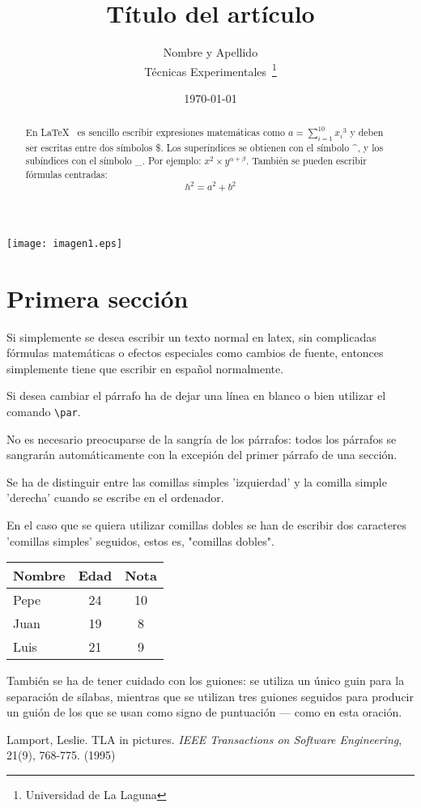 \documentclass[a4paper,12pt]{article}
\begin{document}
\texttt{[image: imagen1.eps]}
\title{Título del artículo}
  \author{Nombre y Apellido \\
          Técnicas Experimentales~\footnote{Universidad de La Laguna}
         }
  \date{\today}
  \maketitle
   \begin{abstract}
     En \LaTeX{}~\cite{Lam:86} es sencillo escribir expresiones
     matemáticas como $a=\sum_{i=1}^{10} {x_i}^{3}$
     y deben ser escritas entre dos símbolos \$.
     Los superíndices se obtienen con el símbolo \^{}, y
     los subíndices con el símbolo \_.
     Por ejemplo: $x^2 \times y^{\alpha + \beta}$.
     También se pueden escribir f\'ormulas centradas:
   \[h^2=a^2 + b^2 \]
 \end{abstract}
 \section{Primera sección}
Si simplemente se desea escribir un texto normal en latex,
sin complicadas f\'ormulas matem\'aticas o efectos especiales
como cambios  de fuente, entonces simplemente tiene que escribir
en espa\~nol normalmente.
\par
Si desea cambiar el p\'arrafo ha de dejar una l\'inea en blanco o bien
utilizar el comando \verb|\par|.

No es necesario preocuparse de la sangr\'ia de los p\'arrafos:
todos los p\'arrafos se sangrar\'an autom\'aticamente con la excepi\'on
del primer p\'arrafo de una secci\'on.

Se ha de distinguir entre las comillas simples 'izquierdad' 
y la comilla simple 'derecha' cuando se escribe en el ordenador.

En el caso que se quiera utilizar comillas dobles se han de
escribir dos caracteres 'comillas simples' seguidos, estos es,
"comillas dobles".

\bigskip
  \begin{tabular}{|l|c|c|}
   \hline
   Nombre & Edad & Nota \\ \hline
   Pepe & 24 & 10 \\ \hline
   Juan & 19 & 8 \\ \hline
   Luis & 21 & 9 \\ \hline
   \end{tabular}
Tambi\'en se ha de tener cuidado con los guiones: se utiliza un \'unico
guin para la separaci\'on de s\'ilabas, mientras que se utilizan 
tres  guiones seguidos para producir un gui\'on de los que se usan
como signo de puntuaci\'on --- como en esta oraci\'on.
\begin{thebibliography}{00}
      Lamport, Leslie.
      TLA in pictures.
      \emph{IEEE Transactions on Software Engineering},
      21(9), 768-775.
      (1995)
\end{thebibliography}
\end{document}
